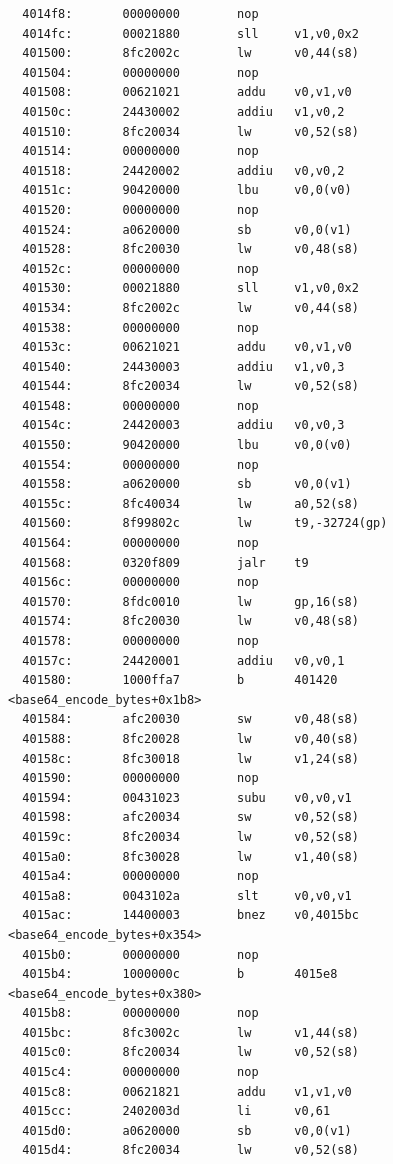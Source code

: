 \documentclass[11pt]{article}
\begin{document}
\begin{verbatim}
  4014f8:       00000000        nop
  4014fc:       00021880        sll     v1,v0,0x2
  401500:       8fc2002c        lw      v0,44(s8)
  401504:       00000000        nop
  401508:       00621021        addu    v0,v1,v0
  40150c:       24430002        addiu   v1,v0,2
  401510:       8fc20034        lw      v0,52(s8)
  401514:       00000000        nop
  401518:       24420002        addiu   v0,v0,2
  40151c:       90420000        lbu     v0,0(v0)
  401520:       00000000        nop
  401524:       a0620000        sb      v0,0(v1)
  401528:       8fc20030        lw      v0,48(s8)
  40152c:       00000000        nop
  401530:       00021880        sll     v1,v0,0x2
  401534:       8fc2002c        lw      v0,44(s8)
  401538:       00000000        nop
  40153c:       00621021        addu    v0,v1,v0
  401540:       24430003        addiu   v1,v0,3
  401544:       8fc20034        lw      v0,52(s8)
  401548:       00000000        nop
  40154c:       24420003        addiu   v0,v0,3
  401550:       90420000        lbu     v0,0(v0)
  401554:       00000000        nop
  401558:       a0620000        sb      v0,0(v1)
  40155c:       8fc40034        lw      a0,52(s8)
  401560:       8f99802c        lw      t9,-32724(gp)
  401564:       00000000        nop
  401568:       0320f809        jalr    t9
  40156c:       00000000        nop
  401570:       8fdc0010        lw      gp,16(s8)
  401574:       8fc20030        lw      v0,48(s8)
  401578:       00000000        nop
  40157c:       24420001        addiu   v0,v0,1
  401580:       1000ffa7        b       401420 <base64_encode_bytes+0x1b8>
  401584:       afc20030        sw      v0,48(s8)
  401588:       8fc20028        lw      v0,40(s8)
  40158c:       8fc30018        lw      v1,24(s8)
  401590:       00000000        nop
  401594:       00431023        subu    v0,v0,v1
  401598:       afc20034        sw      v0,52(s8)
  40159c:       8fc20034        lw      v0,52(s8)
  4015a0:       8fc30028        lw      v1,40(s8)
  4015a4:       00000000        nop
  4015a8:       0043102a        slt     v0,v0,v1
  4015ac:       14400003        bnez    v0,4015bc <base64_encode_bytes+0x354>
  4015b0:       00000000        nop
  4015b4:       1000000c        b       4015e8 <base64_encode_bytes+0x380>
  4015b8:       00000000        nop
  4015bc:       8fc3002c        lw      v1,44(s8)
  4015c0:       8fc20034        lw      v0,52(s8)
  4015c4:       00000000        nop
  4015c8:       00621821        addu    v1,v1,v0
  4015cc:       2402003d        li      v0,61
  4015d0:       a0620000        sb      v0,0(v1)
  4015d4:       8fc20034        lw      v0,52(s8)

\end{verbatim}
\end{document}
